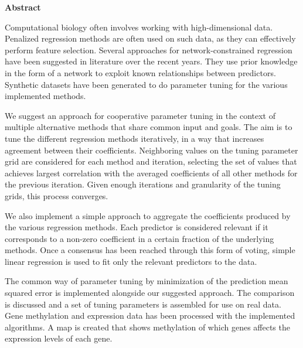 \newpage
{\Huge \bf Abstract}
\vspace{24pt} 

Computational biology often involves working with high-dimensional data. Penalized regression methods are often used on such data, as they can effectively perform feature selection. Several approaches for network-constrained regression have been suggested in literature over the recent years. They use prior knowledge in the form of a network to exploit known relationships between predictors. Synthetic datasets have been generated to do parameter tuning for the various implemented methods. 

We suggest an approach for cooperative parameter tuning in the context of multiple alternative methods that share common input and goals. The aim is to tune the different regression methods iteratively, in a way that increases agreement between their coefficients. Neighboring values on the tuning parameter grid are considered for each method and iteration, selecting the set of values that achieves largest correlation with the averaged coefficients of all other methods for the previous iteration. Given enough iterations and granularity of the tuning grids, this process converges.

We also implement a simple approach to aggregate the coefficients produced by the various regression methods. Each predictor is considered relevant if it corresponds to a non-zero coefficient in a certain fraction of the underlying methods. Once a consensus has been reached through this form of voting, simple linear regression is used to fit only the relevant predictors to the data.

The common way of parameter tuning by minimization of the prediction mean squared error is implemented alongside our suggested approach. The comparison is discussed and a set of tuning parameters is assembled for use on real data. Gene methylation and expression data has been processed with the implemented algorithms. A map is created that shows methylation of which genes affects the expression levels of each gene.

\newpage
\vspace*{\fill}
